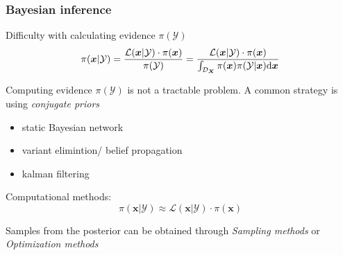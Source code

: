 \begin{frame}
\frametitle{Bayesian inference}
\begin{block}{Difficulty with calculating evidence $\pi(\mathcal{Y})$}
\begin{equation*}               \pi(\boldsymbol{x}|\mathcal{Y}) = 
\frac{{\mathcal{L}(\boldsymbol{x}|\mathcal{Y}) \cdot \pi(\boldsymbol{x})}}{{\pi(\mathcal{Y})}}
= \frac{{\mathcal{L}(\boldsymbol{x}|\mathcal{Y}) \cdot \pi(\boldsymbol{x})}}
{\int_{\mathcal{D}_{\boldsymbol{X}}} 
    \pi(\boldsymbol{x}) \pi(\mathcal{Y}|\boldsymbol{x}) {\rm{d}} \boldsymbol{x}}
\end{equation*}  
\end{block}

Computing evidence ${\pi(\mathcal{Y})}$ is not a tractable problem. A common strategy is using \textit{conjugate priors}  
\begin{itemize}
    \item static Bayesian network
    \item variant elimintion/ belief propagation
    \item kalman filtering
\end{itemize}

\begin{block}{Computational methods:}
 \begin{equation*}               \pi(\boldsymbol{x}|\mathcal{Y}) \approx 
{\mathcal{L}(\boldsymbol{x}|\mathcal{Y}) \cdot \pi(\boldsymbol{x})}
\end{equation*}     
\end{block}
Samples from the posterior can be obtained through \textit{Sampling methods} or \textit{Optimization methods}
\end{frame}

